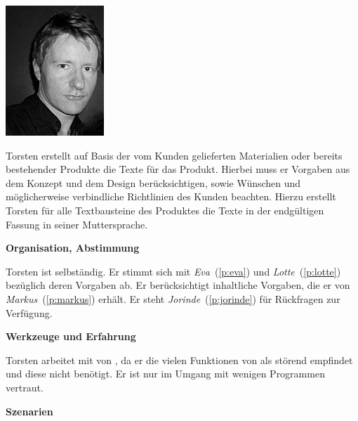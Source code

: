 \begin{multicols}{2}

\begin{center}
\includegraphics[width=0.5\columnwidth]{media/torsten.jpg}
\end{center}


Torsten erstellt auf Basis der vom Kunden gelieferten Materialien oder bereits bestehender Produkte die Texte für das Produkt. Hierbei muss er Vorgaben aus dem Konzept und dem Design berücksichtigen, sowie Wünschen und möglicherweise verbindliche Richtlinien des Kunden beachten. Hierzu erstellt Torsten für alle Textbausteine des Produktes die Texte in der endgültigen Fassung in seiner Muttersprache.

\textbf{Organisation, Abstimmung}

Torsten ist selbständig. Er stimmt sich mit \emph{Eva}~(\ref{p:eva}) und \emph{Lotte}~(\ref{p:lotte}) bezüglich deren Vorgaben ab. Er berücksichtigt inhaltliche Vorgaben, die er von \emph{Markus}~(\ref{p:markus}) erhält. Er steht  \emph{Jorinde}~(\ref{p:jorinde}) für Rückfragen zur Verfügung.

\textbf{Werkzeuge und Erfahrung}

Torsten arbeitet mit  von , da er die vielen Funktionen von  als störend empfindet und diese nicht benötigt. Er ist nur im Umgang mit wenigen Programmen vertraut.

\columnbreak

\textbf{Szenarien}


\end{multicols}
